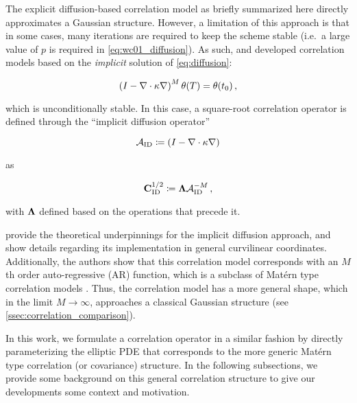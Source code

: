 The explicit diffusion-based correlation model as briefly summarized here
directly approximates a Gaussian structure.
However, a limitation of this approach is that in some cases, many
iterations are required to keep the scheme stable (i.e.\ a large value of $p$ is
required in \cref{eq:wc01_diffusion}).
As such, \citet{mirouze_representation_2010} and
\citet{carrier_background-error_2010} developed correlation models based on the
\textit{implicit} solution of \cref{eq:diffusion}:
\begin{linenomath*}\begin{equation}
    \left( I - \nabla\cdot\kappa\nabla\right)^M\theta(T) = \theta(t_0) \, ,
    \label{eq:implicit_diffusion}
\end{equation}\end{linenomath*}
which is unconditionally stable.
In this case, a square-root correlation operator is defined through the
``implicit diffusion operator''
\begin{linenomath*}\begin{equation}
    \mathcal{A}_\text{ID} \coloneqq \left(I - \nabla \cdot \kappa\nabla\right)
\end{equation}\end{linenomath*}
as
\begin{linenomath*}\begin{equation}
    \mathbf{C}^{1/2}_\text{ID} \coloneqq \bm{\Lambda} \mathcal{A}_\text{ID}^{-M} \, ,
\end{equation}\end{linenomath*}
with $\bm{\Lambda}$ defined based on the operations that precede it.

\citet{mirouze_representation_2010} provide the theoretical underpinnings for
the implicit diffusion approach, and show details regarding its implementation
in general curvilinear coordinates.
Additionally, the authors show that this correlation model corresponds
with an $M$th order auto-regressive (AR) function,
which is a subclass of
Mat\'ern type correlation models \citep[see][for more description of the
parameters controlling this model]{weaver_diffusion_2013}.
Thus, the correlation model has a more general shape, which in the limit
$M\rightarrow\infty$, approaches a classical Gaussian structure (see
\cref{ssec:correlation_comparison}).

In this work, we formulate a correlation operator in a similar fashion by
directly parameterizing the
elliptic PDE that corresponds to the more generic
Mat\'ern type correlation (or covariance) structure.
In the following subsections, we provide some background on this general correlation
structure to give our developments some context and motivation.

